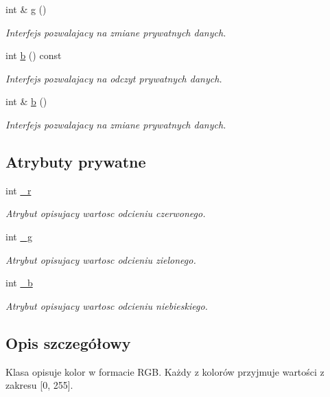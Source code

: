 \begin{DoxyCompactItemize}
int \& \hyperlink{class_kolor_ab5e20d58c58d42747c16155a83aa906f}{g} ()
\begin{DoxyCompactList}\small\item\em Interfejs pozwalajacy na zmiane prywatnych danych. \end{DoxyCompactList}\item 
int \hyperlink{class_kolor_aa240903064a3d8f49585c34d92b74e5d}{b} () const 
\begin{DoxyCompactList}\small\item\em Interfejs pozwalajacy na odczyt prywatnych danych. \end{DoxyCompactList}\item 
int \& \hyperlink{class_kolor_a87677bdafb912de9526302f4844f86a7}{b} ()
\begin{DoxyCompactList}\small\item\em Interfejs pozwalajacy na zmiane prywatnych danych. \end{DoxyCompactList}\end{DoxyCompactItemize}
\subsection*{Atrybuty prywatne}
\begin{DoxyCompactItemize}
\item 
int \hyperlink{class_kolor_ad887fb53be523b39fbead6a24671751e}{\+\_\+r}
\begin{DoxyCompactList}\small\item\em Atrybut opisujacy wartosc odcieniu czerwonego. \end{DoxyCompactList}\item 
int \hyperlink{class_kolor_a568f73268d43f0e76c8ae75f0ef20229}{\+\_\+g}
\begin{DoxyCompactList}\small\item\em Atrybut opisujacy wartosc odcieniu zielonego. \end{DoxyCompactList}\item 
int \hyperlink{class_kolor_a543b5984743ac9d471409c697382038b}{\+\_\+b}
\begin{DoxyCompactList}\small\item\em Atrybut opisujacy wartosc odcieniu niebieskiego. \end{DoxyCompactList}\end{DoxyCompactItemize}


\subsection{Opis szczegółowy}
Klasa opisuje kolor w formacie R\+G\+B. Każdy z kolorów przyjmuje wartości z zakresu \mbox{[}0, 255\mbox{]}. 

